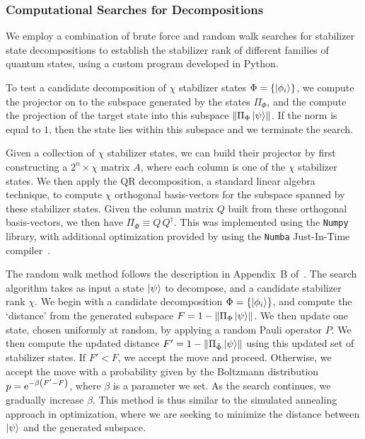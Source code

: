 \subsubsection{Computational Searches for Decompositions}
We employ a combination of brute force and random walk searches for stabilizer state decompositions to establish the stabilizer rank of different families of quantum states, using a custom program developed in Python.\par
To test a candidate decomposition of $\chi$ stabilizer states $\Phi=\{\ket{\phi_{i}}\}$, we compute the projector on to the subspace generated by the states $\Pi_{\Phi}$, and the compute the projection of the target state into this subspace $\norm{\Pi_{\Phi}\ket{\psi}}$. If the norm is equal to $1$, then the state lies within this subspace and we terminate the search.\par
Given a collection of $\chi$ stabilizer states, we can build their projector by first constructing a $2^{n}\times \chi$ matrix $A$, where each column is one of the $\chi$ stabilizer states. We then apply the QR decomposition, a standard linear algebra technique, to compute $\chi$ orthogonal basis-vectors for the subspace spanned by these stabilizer states. Given the column matrix $Q$ built from these orthogonal basis-vectors, we then have $\Pi_{\Phi}\equiv Q\,Q^{\dagger}$. This was implemented using the \texttt{Numpy} library, with additional optimization provided by using the \texttt{Numba} Just-In-Time compiler~\cite{Numpy,Numba}.\par
The random walk method follows the description in Appendix~B of~\cite{Bravyi2015}. The search algorithm takes as input a state $\ket{\psi}$ to decompose, and a candidate stabilizer rank $\chi$. We begin with a candidate decomposition $\Phi=\{\ket{\phi_{i}}\}$, and compute the `distance' from the generated subspace $F=1-\norm{\Pi_{\Phi}\ket{\psi}}$. We then update one state, chosen uniformly at random, by applying a random Pauli operator $P$. We then compute the updated distance $F'=1-\norm{\Pi_{\tilde{\Phi}}\ket{\psi}}$ using this updated set of stabilizer states. If $F'<F$, we accept the move and proceed. Otherwise, we accept the move with a probability given by the Boltzmann distribution $p=\mathrm{e}^{-\beta\left(F'-F\right)}$, where $\beta$ is a parameter we set. As the search continues, we gradually increase $\beta$. This method is thus similar to the simulated annealing approach in optimization, where we are seeking to minimize the distance between $\ket{\psi}$ and the generated subspace.\par
